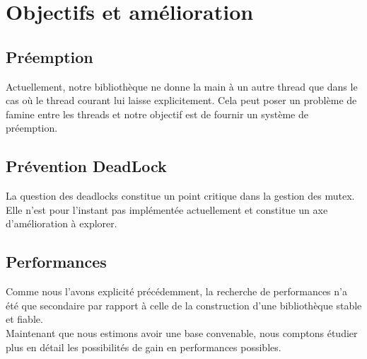 \section{Objectifs et amélioration}

\subsection{Préemption}
Actuellement, notre bibliothèque ne donne la main à un autre thread que dans le cas où le thread courant lui laisse explicitement.
Cela peut poser un problème de famine entre les threads et notre objectif est de fournir un système de préemption.

\subsection{Prévention DeadLock}
La question des deadlocks constitue un point critique dans la gestion des mutex. Elle n'est pour l'instant pas implémentée actuellement et constitue un axe d'amélioration à explorer.

\subsection{Performances}
Comme nous l'avons explicité précédemment, la recherche de performances n'a été que secondaire par rapport
à celle de la construction d'une bibliothèque stable et fiable. \\ 
Maintenant que nous estimons avoir une base convenable, nous comptons étudier plus en détail les possibilités de gain en performances possibles.
